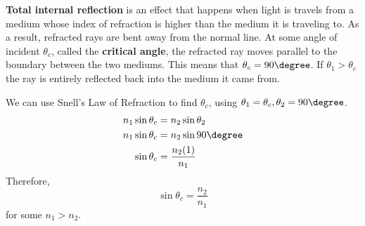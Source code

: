 \textbf{Total internal reflection} is an effect that happens when light is travels from a medium 
whose index of refraction is higher than the medium it is traveling to. As a result, refracted rays 
are bent away from the normal line. At some angle of incident $\theta_c$, called the \textbf{critical
angle}, the refracted ray moves parallel to the boundary between the two mediums. This means that 
$\theta_c = 90\degree$. If $\theta_1 > \theta_c$the ray is entirely reflected back into the medium 
it came from.

We can use Snell's Law of Refraction to find $\theta_c$, using $\theta_1 = \theta_c, \theta_2 = 90\degree$.
\begin{align*}
    n_1\sin\theta_c &= n_2\sin\theta_2\\
    n_1\sin\theta_c &= n_2\sin90\degree\\
    \sin\theta_c &= \frac{n_2(1)}{n_1}\\
\end{align*}
Therefore, \begin{equation}
    \sin\theta_c = \frac{n_2}{n_1}
\end{equation}
for some $n_1 > n_2$.
